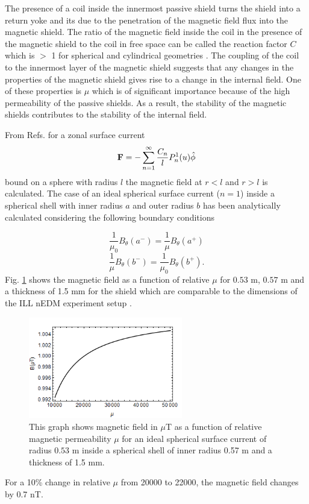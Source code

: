\documentclass[review]{elsarticle}
\begin{document}
The presence of a coil inside the innermost passive shield turns the shield into a return yoke and its due to the penetration of the magnetic field flux into the magnetic shield. The ratio of the magnetic field inside the coil in the presence of the magnetic shield to the coil in free space can be called the reaction factor $C$ which is $>$ 1 for spherical and cylindrical geometries \cite{bib:bidinosti}. The coupling of the coil to the innermost layer of the magnetic shield suggests that any changes in the properties of the magnetic shield gives rise to a change in the internal field. One of these properties is $\mu$ which is of significant importance because of the high permeability of the passive shields. As a result, the stability of the magnetic shields contributes to the stability of the internal field.

From Refs. \cite{bib:smythe, bib:ferraro} for a zonal surface current
\begin{equation}
\bold{F}=- \sum_{n=1} ^{\infty} \frac{C_n}{l} P^1 _n (u) \hat{\phi}
\end{equation}
bound on a sphere with radius $l$ the magnetic field at $r < l$ and $r>l$ is calculated.
The case of an ideal spherical surface current ($n=1$) inside a spherical shell with inner radius $a$ and outer radius $b$ has been analytically calculated considering the following boundary conditions

\begin{equation}
\frac{1}{\mu_0} B_{\theta} (a^-) = \frac{1}{\mu} B_{\theta}(a^+)
\end{equation}
\begin{equation}
\frac{1}{\mu}B_{\theta}(b^-)=\frac{1}{\mu_0}B_{\theta}(b^+).
\end{equation}
Fig. \ref{fig:Magnetic_Field} shows the magnetic field as a function of relative $\mu$ for $0.53$ m, $0.57$ m and a thickness of 1.5 mm for the shield which are comparable to the dimensions of the ILL nEDM experiment setup \cite{bib:baker, bib:knecht}.
\begin{figure}[h!]
\begin{center}
   \includegraphics[width=0.6\textwidth]{B_vs_mu.png}
    \caption{This graph shows magnetic field in $\mu$T as a function of relative magnetic permeability $\mu$ for an ideal spherical surface current of radius $0.53$ m inside a spherical shell of inner radius 0.57 m and a thickness of 1.5 mm.}
    \label{fig:Magnetic_Field}
    \end{center}
\end{figure} 
For a 10\% change in relative $\mu$ from 20000 to 22000, the magnetic field changes by 0.7 nT.
\end{document}
